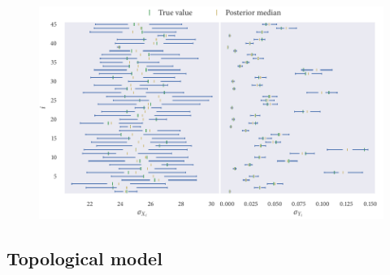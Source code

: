 \begin{figure}[tbp]
    \includegraphics{gauss_hier_summary.pdf}
    \caption{}
\end{figure}

\subsection{Topological model}

